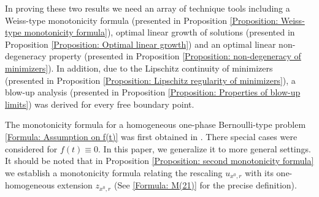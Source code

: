 \documentclass[11pt,reqno]{amsart}
\begin{document}
In proving these two results we need an array of technique tools including a Weiss-type monotonicity formula (presented in Proposition \ref{Proposition: Weiss-type monotonicity formula}), optimal linear growth of solutions (presented in Proposition \ref{Proposition: Optimal linear growth}) and an optimal linear non-degeneracy property (presented in Proposition \ref{Proposition: non-degeneracy of minimizers}). In addition, due to the Lipschitz continuity of minimizers (presented in Proposition \ref{Proposition: Lipschitz regularity of minimizers}), a blow-up analysis (presented in Proposition \ref{Proposition: Properties of blow-up limits}) was derived for every free boundary point.

The monotonicity formula for a homogeneous one-phase Bernoulli-type problem \eqref{Formula: Assumption on f(t)} was first obtained in \cite{W1999}. There special cases were considered for $f(t)\equiv0$. In this paper, we generalize it to more general settings. It should be noted that in Proposition \ref{Proposition: second monotonicity formula} we establish a monotonicity formula relating the rescaling $u_{x^{0},r}$ with its one-homogeneous extension $z_{x^{0},r}$ (See \eqref{Formula: M(21)} for the precise definition).
\end{document}
